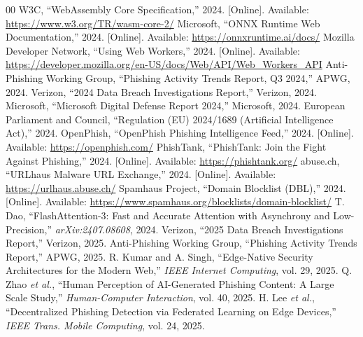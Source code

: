 \documentclass[conference]{IEEEtran}
\begin{document}
\begin{thebibliography}{00}
 W3C, ``WebAssembly Core Specification,'' 2024. [Online]. Available: \url{https://www.w3.org/TR/wasm-core-2/}
 Microsoft, ``ONNX Runtime Web Documentation,'' 2024. [Online]. Available: \url{https://onnxruntime.ai/docs/}
 Mozilla Developer Network, ``Using Web Workers,'' 2024. [Online]. Available: \url{https://developer.mozilla.org/en-US/docs/Web/API/Web_Workers_API}
 Anti-Phishing Working Group, ``Phishing Activity Trends Report, Q3 2024,'' APWG, 2024.
 Verizon, ``2024 Data Breach Investigations Report,'' Verizon, 2024.
 Microsoft, ``Microsoft Digital Defense Report 2024,'' Microsoft, 2024.
 European Parliament and Council, ``Regulation (EU) 2024/1689 (Artificial Intelligence Act),'' 2024.
 OpenPhish, ``OpenPhish Phishing Intelligence Feed,'' 2024. [Online]. Available: \url{https://openphish.com/}
 PhishTank, ``PhishTank: Join the Fight Against Phishing,'' 2024. [Online]. Available: \url{https://phishtank.org/}
 abuse.ch, ``URLhaus Malware URL Exchange,'' 2024. [Online]. Available: \url{https://urlhaus.abuse.ch/}
 Spamhaus Project, ``Domain Blocklist (DBL),'' 2024. [Online]. Available: \url{https://www.spamhaus.org/blocklists/domain-blocklist/}
 T. Dao, ``FlashAttention-3: Fast and Accurate Attention with Asynchrony and Low-Precision,'' \textit{arXiv:2407.08608}, 2024.
 Verizon, ``2025 Data Breach Investigations Report,'' Verizon, 2025.
 Anti-Phishing Working Group, ``Phishing Activity Trends Report,'' APWG, 2025.
 R. Kumar and A. Singh, ``Edge-Native Security Architectures for the Modern Web,'' \textit{IEEE Internet Computing}, vol. 29, 2025.
 Q. Zhao \textit{et al.}, ``Human Perception of AI-Generated Phishing Content: A Large Scale Study,'' \textit{Human-Computer Interaction}, vol. 40, 2025.
 H. Lee \textit{et al.}, ``Decentralized Phishing Detection via Federated Learning on Edge Devices,'' \textit{IEEE Trans. Mobile Computing}, vol. 24, 2025.
\end{thebibliography}
\end{document}
